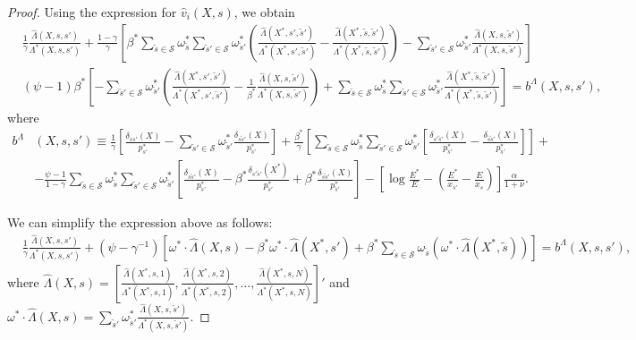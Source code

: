 \begin{proof}
Using the expression for $\hat{v}_i(X,s)$, we obtain\footnotesize
\begin{align}
    &\frac{1}{\gamma}\frac{\hat{\Lambda}(X,s,s')}{\Lambda^*(X,s,s')} + \frac{1-\gamma}{\gamma} \left[ \beta^* \sum_{\tilde{s}\in \mathcal{S}}\omega^*_{\tilde{s}} \sum_{\tilde{s}'\in \mathcal{S}} \omega_{\tilde{s}'}^* \left( \frac{\hat{\Lambda}(X^*,s' ,\tilde{s}')}{\Lambda^*(X^*,s' ,\tilde{s}')} -\frac{\hat{\Lambda}(X^*,\tilde{s},\tilde{s}')}{\Lambda^*(X^*,\tilde{s},\tilde{s}')}   \right)-\sum_{\tilde{s}'  \in \mathcal{S}}\omega^*_{\tilde{s}' } \frac{\hat{\Lambda}(X,s,\tilde{s}' )}{\Lambda^*(X,s,\tilde{s}')} \right]\\
    &(\psi-1) \beta^ *\left[- \sum_{\tilde{s}'\in\mathcal{S}}\omega^*_{\tilde{s}'} \left(\frac{\hat{\Lambda}(X^*,s',\tilde{s}')}{\Lambda^*(X^*,s',\tilde{s}')} - \frac{1}{\beta^*}\frac{\hat{\Lambda}(X,s,\tilde{s}')}{\Lambda^*(X,s,\tilde{s}')}\right) + \sum_{\tilde{s}\in \mathcal{S}}\omega^*_{\tilde{s}} \sum_{\tilde{s}'\in \mathcal{S}} \omega_{\tilde{s}'}^* \frac{\hat{\Lambda}(X^*,\tilde{s},\tilde{s}') }{\Lambda^*(X^*,\tilde{s},\tilde{s}')} \right] =b^\Lambda(X,s,s'),
\end{align}\normalsize
where
\begin{align}
    b^\Lambda&(X,s,s') \equiv \frac{1}{\gamma} \left[\frac{\delta_{ss'}(X)}{p_{s'}^*} - \sum_{\tilde{s}'\in\mathcal{S}} \omega^*_{\tilde{s}'} \frac{\delta_{s\tilde{s}'}(X)}{p_{\tilde{s}'}^*}\right]+\frac{\beta^*}{\gamma} \left[ \sum_{\tilde{s}\in \mathcal{S}}\omega^*_{\tilde{s}} \sum_{\tilde{s}'\in \mathcal{S}} \omega_{\tilde{s}'}^*\left[ \frac{\delta_{s' \tilde{s}'}(X)}{p_{\tilde{s}'}^*}- \frac{\delta_{\tilde{s}\tilde{s}'}(X)}{p_{\tilde{s}'}^*}\right]\right] +\nonumber\\
    &-\frac{\psi-1}{1-\gamma} \sum_{\tilde{s}\in \mathcal{S}}\omega^*_{\tilde{s}} \sum_{\tilde{s}'\in \mathcal{S}} \omega_{\tilde{s}'}^* \left[ \frac{\delta_{s\tilde{s}'}(X)}{p^*_{\tilde{s}'}}-\beta^*\frac{\delta_{s'\tilde{s}'}(X^*)}{p^*_{\tilde{s}'}} + \beta^* \frac{\delta_{\tilde{s}\tilde{s}'}(X)}{p^*_{\tilde{s}'}} \right]  - \left[ \log\frac{E^*}{E} - \left( \frac{E^*}{x_{s'}} - \frac{E}{x_s} \right) \right]\frac{\hat{\alpha}}{1+\nu}.
\end{align}

We can simplify the expression above as follows:\footnotesize
\begin{align}
    &\frac{1}{\gamma}\frac{\hat{\Lambda}(X,s,s')}{\Lambda^*(X,s,s')} +(\psi - \gamma^{-1}) \left[\omega^* \cdot \hat{\Lambda}(X,s) -\beta^* \omega^* \cdot \hat{\Lambda}(X^*,s') + \beta^* \sum_{\tilde{s}\in \mathcal{S}} \omega_{\tilde{s}} ( \omega^* \cdot \hat{\Lambda}(X^*,\tilde{s}) ) \right] = b^\Lambda(X,s,s'),
\end{align}\normalsize
where $\hat{\Lambda}(X,s) = \left[\frac{\hat{\Lambda}(X^*,s,1)}{\Lambda^*(X^*,s,1)}, \frac{\hat{\Lambda}(X^*,s,2)}{\Lambda^*(X^*,s,2)}, \ldots, \frac{\hat{\Lambda}(X^*,s,N)}{\Lambda^*(X^*,s,N)} \right]'$ and $\omega^* \cdot \hat{\Lambda}(X, s) = \sum_{\tilde{s}' } \omega^*_{\tilde{s}'} \frac{\hat{\Lambda}(X,s,\tilde{s}')}{\Lambda^*(X,s,\tilde{s}')}$.


\end{proof}
